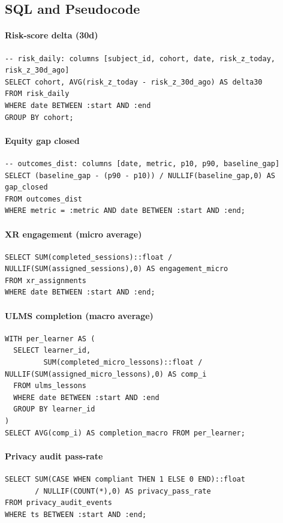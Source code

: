 \documentclass[11pt]{article}
\theoremstyle{plain}
\begin{document}
\subsection{SQL and Pseudocode}

\paragraph{Risk-score delta (30d)}
\begin{verbatim}
-- risk_daily: columns [subject_id, cohort, date, risk_z_today, risk_z_30d_ago]
SELECT cohort, AVG(risk_z_today - risk_z_30d_ago) AS delta30
FROM risk_daily
WHERE date BETWEEN :start AND :end
GROUP BY cohort;
\end{verbatim}

\paragraph{Equity gap closed}
\begin{verbatim}
-- outcomes_dist: columns [date, metric, p10, p90, baseline_gap]
SELECT (baseline_gap - (p90 - p10)) / NULLIF(baseline_gap,0) AS gap_closed
FROM outcomes_dist
WHERE metric = :metric AND date BETWEEN :start AND :end;
\end{verbatim}

\paragraph{XR engagement (micro average)}
\begin{verbatim}
SELECT SUM(completed_sessions)::float / NULLIF(SUM(assigned_sessions),0) AS engagement_micro
FROM xr_assignments
WHERE date BETWEEN :start AND :end;
\end{verbatim}

\paragraph{ULMS completion (macro average)}
\begin{verbatim}
WITH per_learner AS (
  SELECT learner_id,
         SUM(completed_micro_lessons)::float / NULLIF(SUM(assigned_micro_lessons),0) AS comp_i
  FROM ulms_lessons
  WHERE date BETWEEN :start AND :end
  GROUP BY learner_id
)
SELECT AVG(comp_i) AS completion_macro FROM per_learner;
\end{verbatim}

\paragraph{Privacy audit pass-rate}
\begin{verbatim}
SELECT SUM(CASE WHEN compliant THEN 1 ELSE 0 END)::float
       / NULLIF(COUNT(*),0) AS privacy_pass_rate
FROM privacy_audit_events
WHERE ts BETWEEN :start AND :end;
\end{verbatim}
\end{document}
